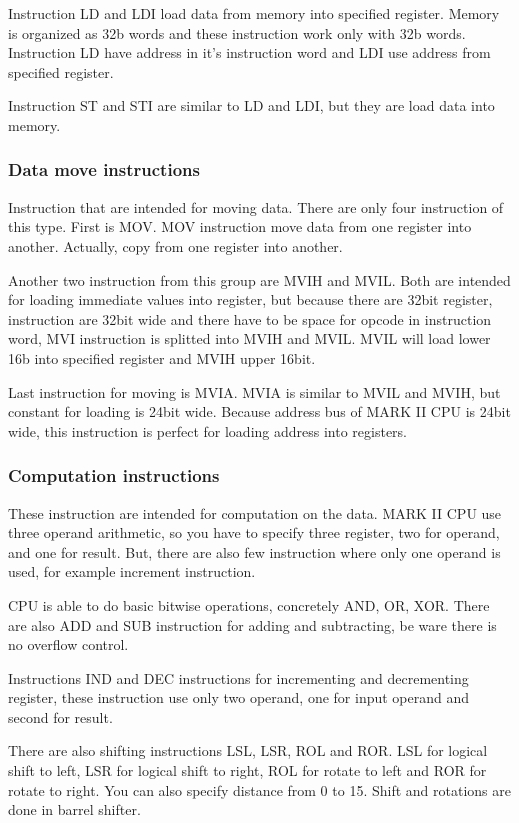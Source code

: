 Instruction LD and LDI load data from memory into specified register. Memory is
organized as 32b words and these instruction work only with 32b words.
Instruction LD have address in it's instruction word and LDI use address from
specified register.

Instruction ST and STI are similar to LD and LDI, but they are load data into
memory.

\subsubsection{Data move instructions}

Instruction that are intended for moving data. There are only four instruction
of this type. First is MOV. MOV instruction move data from one register into
another. Actually, copy from one register into another.

Another two instruction from this group are MVIH and MVIL. Both are intended
for loading immediate values into register, but because there are 32bit
register, instruction are 32bit wide and there have to be space for opcode in
instruction word, MVI instruction is splitted into MVIH and MVIL. MVIL will
load lower 16b into specified register and MVIH upper 16bit.

Last instruction for moving is MVIA. MVIA is similar to MVIL and MVIH, but
constant for loading is 24bit wide. Because address bus of MARK II CPU is 24bit
wide, this instruction is perfect for loading address into registers.

\subsubsection{Computation instructions}

These instruction are intended for computation on the data. MARK II CPU use
three operand arithmetic, so you have to specify three register, two for
operand, and one for result. But, there are also few instruction where only one
operand is used, for example increment instruction.

CPU is able to do basic bitwise operations, concretely AND, OR, XOR. There are
also ADD and SUB instruction for adding and subtracting, be ware there is no
overflow control.

Instructions IND and DEC instructions for incrementing and decrementing
register, these instruction use only two operand, one for input operand and
second for result.

There are also shifting instructions LSL, LSR, ROL and ROR. LSL for logical
shift to left, LSR for logical shift to right, ROL for rotate to left and ROR
for rotate to right. You can also specify distance from 0 to 15. Shift and
rotations are done in barrel shifter.

